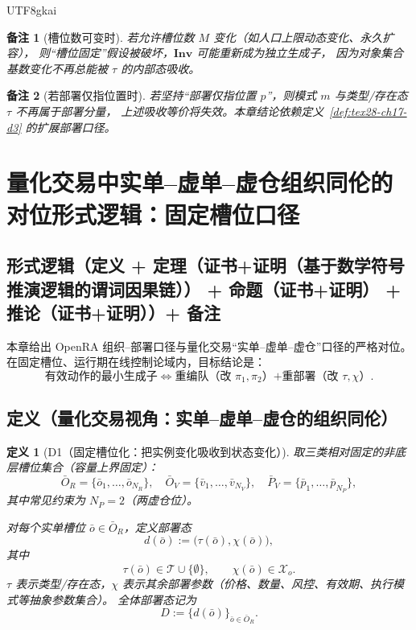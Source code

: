 \documentclass[12pt]{article}
\newtheorem{definition}{定义}[section]
\newtheorem{remark}{备注}[section]
\begin{document}
\begin{CJK*}{UTF8}{gkai}
\begin{remark}[槽位数可变时]
若允许槽位数 $M$ 变化（如人口上限动态变化、永久扩容），
则“槽位固定”假设被破坏，$\mathbf{Inv}$ 可能重新成为独立生成子，
因为对象集合基数变化不再总能被 $\tau$ 的内部态吸收。
\end{remark}

\begin{remark}[若部署仅指位置时]
若坚持“部署仅指位置 $p$”，则模式 $m$ 与类型/存在态 $\tau$ 不再属于部署分量，
上述吸收等价将失效。本章结论依赖定义~\ref{def:tex28-ch17-d3} 的扩展部署口径。
\end{remark}

\section{量化交易中实单--虚单--虚仓组织同伦的对位形式逻辑：固定槽位口径}
\label{sec:tex28-ch18}

\subsection{形式逻辑（定义 + 定理（证书+证明（基于数学符号推演逻辑的谓词因果链）） + 命题（证书+证明） + 推论（证书+证明））+ 备注}
\label{subsec:tex28-ch18-logic}
本章给出 OpenRA 组织--部署口径与量化交易“实单--虚单--虚仓”口径的严格对位。
在固定槽位、运行期在线控制论域内，目标结论是：
\[
  \text{有效动作的最小生成子}
  \Longleftrightarrow
  \text{重编队（改 }\pi_1,\pi_2\text{）+重部署（改 }\tau,\chi\text{）}.
\]

\subsection{定义（量化交易视角：实单--虚单--虚仓的组织同伦）}
\label{subsec:tex28-ch18-defs}

\begin{definition}[D1（固定槽位化：把实例变化吸收到状态变化）]
\label{def:tex28-ch18-d1}
取三类相对固定的非底层槽位集合（容量上界固定）：
\[
  \bar O_R=\{\bar o_1,\dots,\bar o_{N_R}\},
  \quad
  \bar O_V=\{\bar v_1,\dots,\bar v_{N_V}\},
  \quad
  \bar P_V=\{\bar p_1,\dots,\bar p_{N_P}\},
\]
其中常见约束为 $N_P=2$（两虚仓位）。

对每个实单槽位 $\bar o\in\bar O_R$，定义部署态
\[
  d(\bar o):=\bigl(\tau(\bar o),\chi(\bar o)\bigr),
\]
其中
\[
  \tau(\bar o)\in\mathcal T\cup\{\emptyset\},
  \qquad
  \chi(\bar o)\in\mathcal X_o.
\]
$\tau$ 表示类型/存在态，$\chi$ 表示其余部署参数（价格、数量、风控、有效期、执行模式等抽象参数集合）。
全体部署态记为
\[
  D:=\{d(\bar o)\}_{\bar o\in\bar O_R}.
\]
\end{definition}


\end{CJK*}
\end{document}
